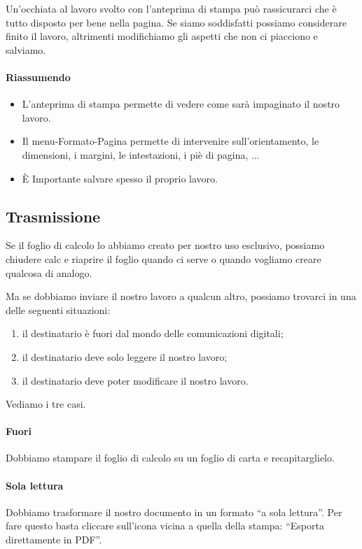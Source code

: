 \salvare

Un'occhiata al lavoro svolto con l'anteprima di stampa può rassicurarci che
è tutto disposto per bene nella pagina.
Se siamo soddisfatti possiamo considerare finito il lavoro, altrimenti
modifichiamo gli aspetti che non ci piacciono e salviamo.

\paragraph{Riassumendo}

\begin{itemize} [nosep]
\item L'anteprima di stampa permette di vedere come sarà impaginato il nostro 
lavoro.
\item Il menu-Formato-Pagina permette di intervenire sull'orientamento,
le dimensioni, i margini, le intestazioni, i piè di pagina, ...
\item È Importante salvare spesso il proprio lavoro.
\end{itemize}

\subsection{Trasmissione}

Se il foglio di calcolo lo abbiamo creato per nostro uso esclusivo, possiamo 
chiudere calc e riaprire il foglio quando ci serve o quando vogliamo creare 
qualcosa di analogo.

Ma se dobbiamo inviare il nostro lavoro a qualcun altro, possiamo trovarci in 
una delle seguenti situazioni:
\begin{enumerate} [noitemsep]
\item il destinatario è fuori dal mondo delle comunicazioni digitali;
\item il destinatario deve solo leggere il nostro lavoro;
\item il destinatario deve poter modificare il nostro lavoro.
\end{enumerate}

Vediamo i tre casi.

\paragraph{Fuori} 
Dobbiamo stampare il foglio di calcolo su un foglio di carta e recapitarglielo.

\paragraph{Sola lettura}
Dobbiamo trasformare il nostro documento in un formato ``a sola lettura''. 
Per fare questo basta cliccare sull'icona vicina a quella della stampa: 
``Esporta direttamente in PDF''.

